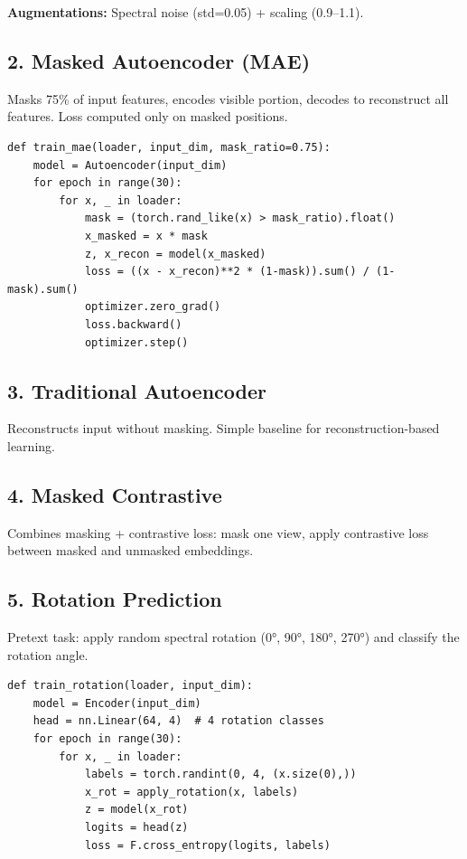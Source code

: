 \documentclass[11pt,a4paper]{article}
\begin{document}
\textbf{Augmentations:} Spectral noise (std=0.05) + scaling (0.9–1.1).

\subsection{2. Masked Autoencoder (MAE)}
Masks 75\% of input features, encodes visible portion, decodes to reconstruct all features. Loss computed only on masked positions.

\begin{lstlisting}
def train_mae(loader, input_dim, mask_ratio=0.75):
    model = Autoencoder(input_dim)
    for epoch in range(30):
        for x, _ in loader:
            mask = (torch.rand_like(x) > mask_ratio).float()
            x_masked = x * mask
            z, x_recon = model(x_masked)
            loss = ((x - x_recon)**2 * (1-mask)).sum() / (1-mask).sum()
            optimizer.zero_grad()
            loss.backward()
            optimizer.step()
\end{lstlisting}

\subsection{3. Traditional Autoencoder}
Reconstructs input without masking. Simple baseline for reconstruction-based learning.

\subsection{4. Masked Contrastive}
Combines masking + contrastive loss: mask one view, apply contrastive loss between masked and unmasked embeddings.

\subsection{5. Rotation Prediction}
Pretext task: apply random spectral rotation (0°, 90°, 180°, 270°) and classify the rotation angle. 

\begin{lstlisting}
def train_rotation(loader, input_dim):
    model = Encoder(input_dim)
    head = nn.Linear(64, 4)  # 4 rotation classes
    for epoch in range(30):
        for x, _ in loader:
            labels = torch.randint(0, 4, (x.size(0),))
            x_rot = apply_rotation(x, labels)
            z = model(x_rot)
            logits = head(z)
            loss = F.cross_entropy(logits, labels)
\end{lstlisting}
\end{document}
